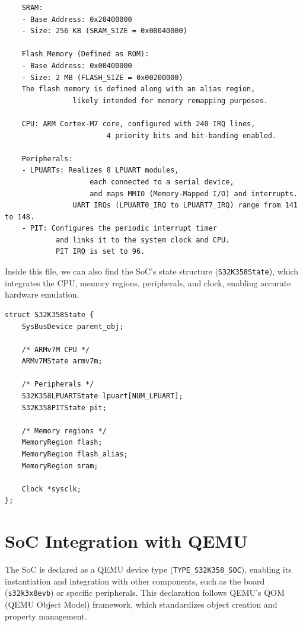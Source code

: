 \begin{verbatim}
    SRAM:
    - Base Address: 0x20400000
    - Size: 256 KB (SRAM_SIZE = 0x00040000)

    Flash Memory (Defined as ROM):
    - Base Address: 0x00400000
    - Size: 2 MB (FLASH_SIZE = 0x00200000)
    The flash memory is defined along with an alias region, 
                likely intended for memory remapping purposes.

    CPU: ARM Cortex-M7 core, configured with 240 IRQ lines, 
                        4 priority bits and bit-banding enabled.

    Peripherals: 
    - LPUARTs: Realizes 8 LPUART modules, 
                    each connected to a serial device, 
                    and maps MMIO (Memory-Mapped I/O) and interrupts.
                UART IRQs (LPUART0_IRQ to LPUART7_IRQ) range from 141 to 148.
    - PIT: Configures the periodic interrupt timer 
            and links it to the system clock and CPU.
            PIT IRQ is set to 96.
\end{verbatim}

\noindent Inside this file, we can also find the SoC’s state structure (\texttt{S32K358State}), which integrates the CPU, memory regions, peripherals, and clock, enabling accurate hardware emulation.
\begin{verbatim}
struct S32K358State {
    SysBusDevice parent_obj;

    /* ARMv7M CPU */
    ARMv7MState armv7m;

    /* Peripherals */
    S32K358LPUARTState lpuart[NUM_LPUART];
    S32K358PITState pit;

    /* Memory regions */
    MemoryRegion flash;
    MemoryRegion flash_alias;
    MemoryRegion sram;

    Clock *sysclk;
};
\end{verbatim}

\section{SoC Integration with QEMU}
The SoC is declared as a QEMU device type (\texttt{TYPE\_S32K358\_SOC}), enabling its instantiation and integration with other components, such as the board (\texttt{s32k3x8evb}) or specific peripherals. This declaration follows QEMU’s QOM (QEMU Object Model) framework, which standardizes object creation and property management.

\vspace{0.5cm}


